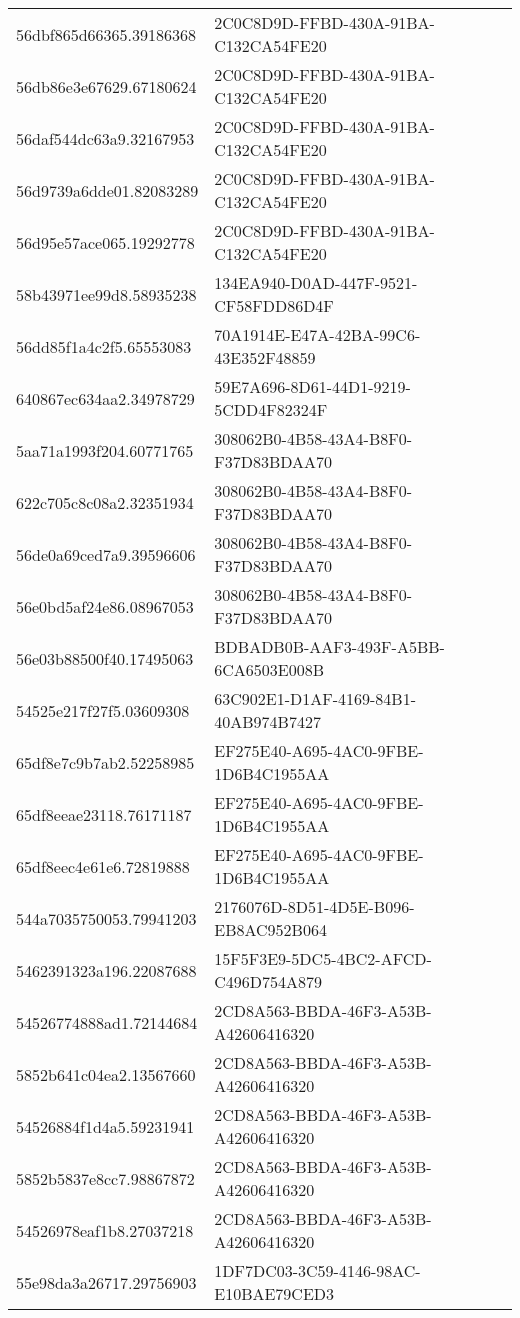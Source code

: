 \begin{tabular}{ll}
56dbf865d66365.39186368 & 2C0C8D9D-FFBD-430A-91BA-C132CA54FE20 \\
56db86e3e67629.67180624 & 2C0C8D9D-FFBD-430A-91BA-C132CA54FE20 \\
56daf544dc63a9.32167953 & 2C0C8D9D-FFBD-430A-91BA-C132CA54FE20 \\
56d9739a6dde01.82083289 & 2C0C8D9D-FFBD-430A-91BA-C132CA54FE20 \\
56d95e57ace065.19292778 & 2C0C8D9D-FFBD-430A-91BA-C132CA54FE20 \\
58b43971ee99d8.58935238 & 134EA940-D0AD-447F-9521-CF58FDD86D4F \\
56dd85f1a4c2f5.65553083 & 70A1914E-E47A-42BA-99C6-43E352F48859 \\
640867ec634aa2.34978729 & 59E7A696-8D61-44D1-9219-5CDD4F82324F \\
5aa71a1993f204.60771765 & 308062B0-4B58-43A4-B8F0-F37D83BDAA70 \\
622c705c8c08a2.32351934 & 308062B0-4B58-43A4-B8F0-F37D83BDAA70 \\
56de0a69ced7a9.39596606 & 308062B0-4B58-43A4-B8F0-F37D83BDAA70 \\
56e0bd5af24e86.08967053 & 308062B0-4B58-43A4-B8F0-F37D83BDAA70 \\
56e03b88500f40.17495063 & BDBADB0B-AAF3-493F-A5BB-6CA6503E008B \\
54525e217f27f5.03609308 & 63C902E1-D1AF-4169-84B1-40AB974B7427 \\
65df8e7c9b7ab2.52258985 & EF275E40-A695-4AC0-9FBE-1D6B4C1955AA \\
65df8eeae23118.76171187 & EF275E40-A695-4AC0-9FBE-1D6B4C1955AA \\
65df8eec4e61e6.72819888 & EF275E40-A695-4AC0-9FBE-1D6B4C1955AA \\
544a7035750053.79941203 & 2176076D-8D51-4D5E-B096-EB8AC952B064 \\
5462391323a196.22087688 & 15F5F3E9-5DC5-4BC2-AFCD-C496D754A879 \\
54526774888ad1.72144684 & 2CD8A563-BBDA-46F3-A53B-A42606416320 \\
5852b641c04ea2.13567660 & 2CD8A563-BBDA-46F3-A53B-A42606416320 \\
54526884f1d4a5.59231941 & 2CD8A563-BBDA-46F3-A53B-A42606416320 \\
5852b5837e8cc7.98867872 & 2CD8A563-BBDA-46F3-A53B-A42606416320 \\
54526978eaf1b8.27037218 & 2CD8A563-BBDA-46F3-A53B-A42606416320 \\
55e98da3a26717.29756903 & 1DF7DC03-3C59-4146-98AC-E10BAE79CED3 \\

\end{tabular}
